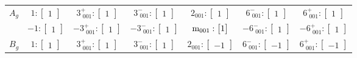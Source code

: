 \documentclass[fleqn,8pt,landscape]{jsarticle}
\begin{document}
\begin{longtable}{ccccccc}
$ A_{g} $ & $ 1:\begin{bmatrix} 1 \end{bmatrix} $ & $ 3^{+}_{\,\,001}:\begin{bmatrix} 1 \end{bmatrix} $ & $ 3^{-}_{\,\,001}:\begin{bmatrix} 1 \end{bmatrix} $ & $ 2{}_{001}:\begin{bmatrix} 1 \end{bmatrix} $ & $ 6^{-}_{\,\,001}:\begin{bmatrix} 1 \end{bmatrix} $ & $ 6^{+}_{\,\,001}:\begin{bmatrix} 1 \end{bmatrix} $ \\
& $ -1:\begin{bmatrix} 1 \end{bmatrix} $ & $ -3^{+}_{\,\,001}:\begin{bmatrix} 1 \end{bmatrix} $ & $ -3^{-}_{\,\,001}:\begin{bmatrix} 1 \end{bmatrix} $ & $ {\rm m}_{001}:\begin{bmatrix} 1 \end{bmatrix} $ & $ -6^{-}_{\,\,001}:\begin{bmatrix} 1 \end{bmatrix} $ & $ -6^{+}_{\,\,001}:\begin{bmatrix} 1 \end{bmatrix} $ \\ \hline
$ B_{g} $ & $ 1:\begin{bmatrix} 1 \end{bmatrix} $ & $ 3^{+}_{\,\,001}:\begin{bmatrix} 1 \end{bmatrix} $ & $ 3^{-}_{\,\,001}:\begin{bmatrix} 1 \end{bmatrix} $ & $ 2{}_{001}:\begin{bmatrix} -1 \end{bmatrix} $ & $ 6^{-}_{\,\,001}:\begin{bmatrix} -1 \end{bmatrix} $ & $ 6^{+}_{\,\,001}:\begin{bmatrix} -1 \end{bmatrix} $ \\

\end{longtable}
\end{document}
